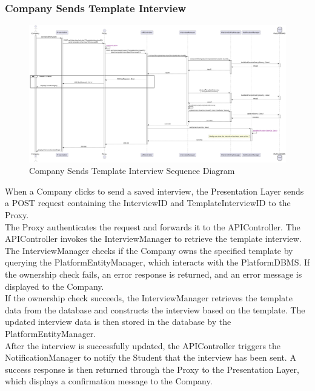 \subsubsection*{Company Sends Template Interview}
\begin{figure}[H]
    \centering
    \includegraphics[width=\linewidth]{Latex/Images/DD/SequenceDiagrams/23CompanySendTemplateInterview.png}
    \caption{Company Sends Template Interview Sequence Diagram}
    \label{fig:compsenstempint}
\end{figure}
When a Company clicks to send a saved interview, the Presentation Layer sends a POST request containing the InterviewID and TemplateInterviewID to the Proxy.\\
The Proxy authenticates the request and forwards it to the APIController. The APIController invokes the InterviewManager to retrieve the template interview. The InterviewManager checks if the Company owns the specified template by querying the PlatformEntityManager, which interacts with the PlatformDBMS. If the ownership check fails, an error response is returned, and an error message is displayed to the Company.\\
If the ownership check succeeds, the InterviewManager retrieves the template data from the database and constructs the interview based on the template. The updated interview data is then stored in the database by the PlatformEntityManager.\\
After the interview is successfully updated, the APIController triggers the NotificationManager to notify the Student that the interview has been sent. A success response is then returned through the Proxy to the Presentation Layer, which displays a confirmation message to the Company.
